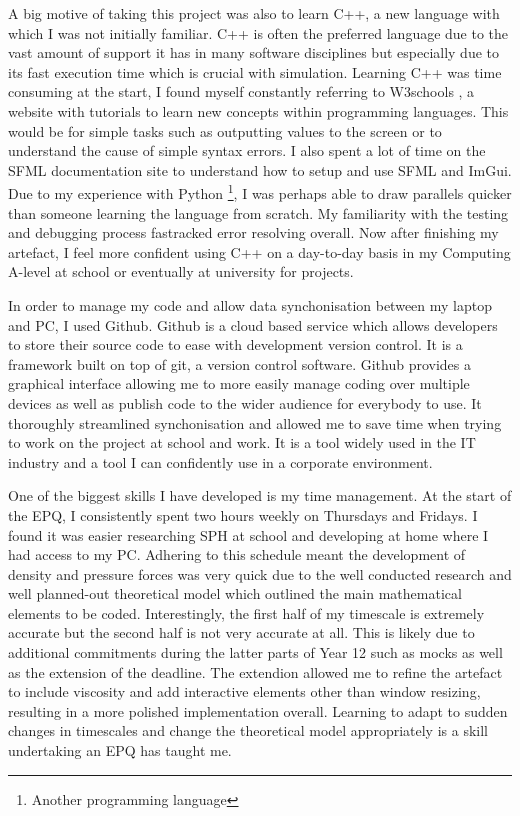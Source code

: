 \documentclass[write-up.tex]{subfiles}
\begin{document}
A big motive of taking this project was also to learn C++, a new language with which I was not initially familiar. C++ is often the preferred language due to the vast amount of support it has in many software disciplines but especially due to its fast execution time which is crucial with simulation. Learning C++ was time consuming at the start, I found myself constantly referring to W3schools \cite{W3schools}, a website with tutorials to learn new concepts within programming languages. This would be for simple tasks such as outputting values to the screen or to understand the cause of simple syntax errors. I also spent a lot of time on the SFML documentation site \cite{SFML} to understand how to setup and use SFML and ImGui. Due to my experience with Python \footnote{Another programming language}, I was perhaps able to draw parallels quicker than someone learning the language from scratch. My familiarity with the testing and debugging process fastracked error resolving overall. Now after finishing my artefact, I feel more confident using C++ on a day-to-day basis in my Computing A-level at school or eventually at university for projects.

In order to manage my code and allow data synchonisation between my laptop and PC, I used Github. Github is a cloud based service which allows developers to store their source code to ease with development version control. It is a framework built on top of git, a version control software. Github provides a graphical interface allowing me to more easily manage coding over multiple devices as well as publish code to the wider audience for everybody to use. It thoroughly streamlined synchonisation and allowed me to save time when trying to work on the project at school and work. It is a tool widely used in the IT industry and a tool I can confidently use in a corporate environment.

One of the biggest skills I have developed is my time management. At the start of the EPQ, I consistently spent two hours weekly on Thursdays and Fridays. I found it was easier researching SPH at school and developing at home where I had access to my PC. Adhering to this schedule meant the development of density and pressure forces was very quick due to the well conducted research and well planned-out theoretical model which outlined the main mathematical elements to be coded. Interestingly, the first half of my timescale is extremely accurate but the second half is not very accurate at all. This is likely due to additional commitments during the latter parts of Year 12 such as mocks as well as the extension of the deadline. The extendion allowed me to refine the artefact to include viscosity and add interactive elements other than window resizing, resulting in a more polished implementation overall. Learning to adapt to sudden changes in timescales and change the theoretical model appropriately is a skill undertaking an EPQ has taught me.
\end{document}
